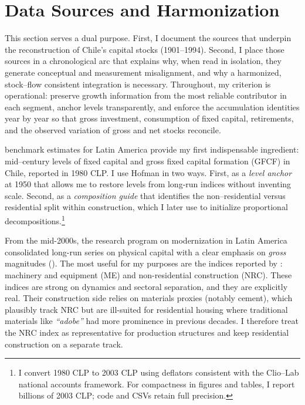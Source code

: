 \section{Data Sources and Harmonization}\label{sec:data}

This section serves a dual purpose. First, I document the sources that underpin the reconstruction of Chile’s capital stocks (1901--1994). Second, I place those sources in a chronological arc that explains why, when read in isolation, they generate conceptual and measurement misalignment, and why a harmonized, stock–flow consistent integration is necessary. Throughout, my criterion is operational: preserve growth information from the most reliable contributor in each segment, anchor levels transparently, and enforce the accumulation identities year by year so that gross investment, consumption of fixed capital, retirements, and the observed variation of gross and net stocks reconcile.

\citet{Hofman2000} benchmark estimates for Latin America provide my first indispensable ingredient: mid–century levels of fixed capital and gross fixed capital formation (GFCF) in Chile, reported in 1980 CLP. I use Hofman in two ways. First, as a \emph{level anchor} at 1950 that allows me to restore levels from long-run indices without inventing scale. Second, as a \emph{composition guide} that identifies the non–residential versus residential split within construction, which I later use to initialize proportional decompositions.\footnote{I convert \citet{Hofman2000} 1980 CLP to 2003 CLP using deflators consistent with the Clio--Lab national accounts framework. For compactness in figures and tables, I report billions of 2003 CLP; code and CSVs retain full precision.}

From the mid-2000s, the research program on modernization in Latin America consolidated long-run series on physical capital with a clear emphasis on \emph{gross} magnitudes (\citealt{Carreras2006}). The most useful for my purposes are the indices reported by \citet{Tafunell2016}: machinery and equipment (ME) and non-residential construction (NRC). These indices are strong on dynamics and sectoral separation, and they are explicitly real. Their construction side relies on materials proxies (notably cement), which plausibly track NRC but are ill-suited for residential housing where traditional materials like \emph{``adobe''} had more prominence in previous decades. I therefore treat the NRC index as representative for production structures and keep residential construction on a separate track. 

